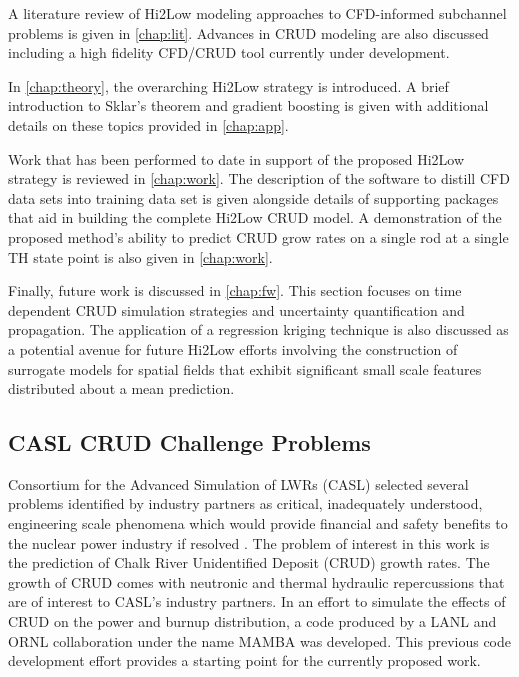 A literature review of Hi2Low modeling approaches to CFD-informed subchannel
problems is given in \autoref{chap:lit}.  Advances in CRUD modeling are
also discussed including a high fidelity
CFD/CRUD tool currently under development.  

In \autoref{chap:theory}, the overarching Hi2Low strategy is introduced.  A
brief introduction to Sklar's theorem and gradient boosting is given with
additional details on these topics provided in \autoref{chap:app}.

Work that has been performed to date in support of the proposed Hi2Low strategy is reviewed in
\autoref{chap:work}.  The description of the software to distill CFD data sets into
training data set is given alongside details of supporting packages that aid in building
the complete Hi2Low CRUD model.
A demonstration of the proposed method's ability to predict CRUD grow
rates on a single rod at a single TH state point is also given in
\autoref{chap:work}.

Finally, future work is discussed in \autoref{chap:fw}.  This section
focuses on time dependent CRUD simulation strategies and uncertainty
quantification and propagation.  The application of a regression kriging
technique is also discussed as a potential avenue for future Hi2Low efforts
involving the construction of surrogate models for spatial fields that exhibit
significant small scale features distributed about a mean prediction.

\subsection{CASL CRUD Challenge Problems}

Consortium for the Advanced Simulation of LWRs (CASL) selected several problems identified by industry partners as critical, inadequately understood, engineering scale phenomena which would provide
financial and safety benefits to the nuclear power industry if resolved \cite{Turinsky15}.
The problem of
interest in this work is the prediction of Chalk River Unidentified Deposit
(CRUD) growth rates.  The growth of CRUD comes with neutronic and thermal
hydraulic repercussions that are of interest to CASL's industry partners.
In an effort to simulate the
effects of CRUD on the power and burnup distribution, a code produced by a LANL
and ORNL collaboration \cite{collins16} under the name MAMBA was developed.
This previous code development effort provides a starting point for the currently proposed work.

